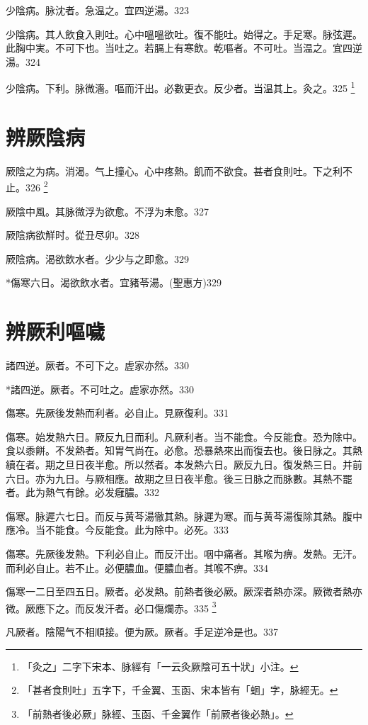 \documentclass[12pt,twoside,UTF8,b5paper]{ctexbook}
\begin{document}
少陰病。脉沈者。急温之。宜四逆湯。323

少陰病。其人飲食入則吐。心中嗢嗢欲吐。復不能吐。始得之。手足寒。脉弦遲。此胸中実。不可下也。当吐之。若膈上有寒飲。乾嘔者。不可吐。当温之。宜四逆湯。324

少陰病。下利。脉微濇。嘔而汗出。必數更衣。反少者。当温其上。灸之。325
	\footnote{「灸之」二字下宋本、脉經有「一云灸厥陰可五十狀」小注。}

\chapter{辨厥陰病}

厥陰之为病。消渴。气上撞{心}。心中疼熱。飢而不欲食。{甚者}食則吐。下之利不止。326
	\footnote{「甚者食則吐」五字下，千金翼、玉函、宋本皆有「蛔」字，脉經无。}

厥陰中風。其脉微浮为欲愈。不浮为未愈。327

厥陰病欲觧时。從丑尽卯。328

厥陰病。渴欲飲水者。少少与之即愈。329

*傷寒六日。渴欲飲水者。宜豬苓湯。(聖惠方)329

\chapter{辨厥利嘔噦}

諸四逆。厥者。不可下之。虗家亦然。330

*諸四逆。厥者。不可吐之。虗家亦然。330

傷寒。先厥後发熱而利者。必自止。見厥復利。331

傷寒。始发熱六日。厥反九日而利。凡厥利者。当不能食。今反能食。恐为除中。食以黍餅。不发熱者。知胃气尚在。必愈。恐暴熱來出而復去也。後日脉之。其熱續在者。期之旦日夜半愈。所以然者。本发熱六日。厥反九日。復发熱三日。并前六日。亦为九日。与厥相應。故期之旦日夜半愈。後三日脉之而脉數。其熱不罷者。此为熱气有餘。必发癰膿。332

傷寒。脉遲六七日。而反与黄芩湯徹其熱。脉遲为寒。而与黄芩湯復除其熱。腹中應冷。当不能食。今反能食。此为除中。必死。333

傷寒。先厥後发熱。下利必自止。而反汗出。咽中痛者。其喉为痹。发熱。无汗。而利必自止。若不止。必便膿血。便膿血者。其喉不痹。334

傷寒一二日至四五日。厥者。必发熱。前熱者後必厥。厥深者熱亦深。厥微者熱亦微。厥應下之。而反发汗者。必口傷爛赤。335
	\footnote{「前熱者後必厥」脉經、玉函、千金翼作「前厥者後必熱」。}

凡厥者。陰陽气不相順接。便为厥。厥者。手足逆冷是也。337
\end{document}
